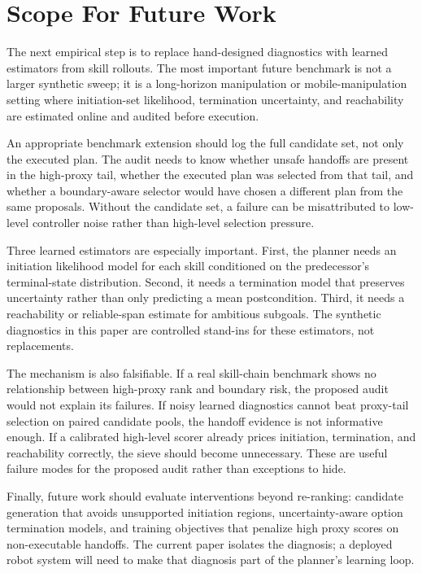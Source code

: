 \documentclass{article}
\begin{document}
\section{Scope For Future Work}

The next empirical step is to replace hand-designed diagnostics with learned estimators from skill rollouts. The most important future benchmark is not a larger synthetic sweep; it is a long-horizon manipulation or mobile-manipulation setting where initiation-set likelihood, termination uncertainty, and reachability are estimated online and audited before execution.

An appropriate benchmark extension should log the full candidate set, not only the executed plan. The audit needs to know whether unsafe handoffs are present in the high-proxy tail, whether the executed plan was selected from that tail, and whether a boundary-aware selector would have chosen a different plan from the same proposals. Without the candidate set, a failure can be misattributed to low-level controller noise rather than high-level selection pressure.

Three learned estimators are especially important. First, the planner needs an initiation likelihood model for each skill conditioned on the predecessor's terminal-state distribution. Second, it needs a termination model that preserves uncertainty rather than only predicting a mean postcondition. Third, it needs a reachability or reliable-span estimate for ambitious subgoals. The synthetic diagnostics in this paper are controlled stand-ins for these estimators, not replacements.

The mechanism is also falsifiable. If a real skill-chain benchmark shows no relationship between high-proxy rank and boundary risk, the proposed audit would not explain its failures. If noisy learned diagnostics cannot beat proxy-tail selection on paired candidate pools, the handoff evidence is not informative enough. If a calibrated high-level scorer already prices initiation, termination, and reachability correctly, the sieve should become unnecessary. These are useful failure modes for the proposed audit rather than exceptions to hide.

Finally, future work should evaluate interventions beyond re-ranking: candidate generation that avoids unsupported initiation regions, uncertainty-aware option termination models, and training objectives that penalize high proxy scores on non-executable handoffs. The current paper isolates the diagnosis; a deployed robot system will need to make that diagnosis part of the planner's learning loop.
\end{document}
